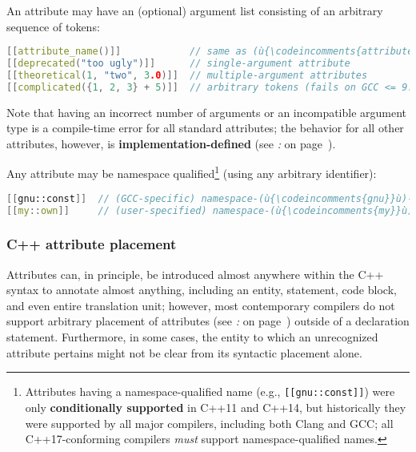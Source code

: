 \noindent An attribute may have an (optional) argument list consisting of an
arbitrary sequence of tokens:

\begin{lstlisting}[language=C++]
[[attribute_name()]]            // same as (ù{\codeincomments{attribute\_name}}ù)
[[deprecated("too ugly")]]      // single-argument attribute
[[theoretical(1, "two", 3.0)]]  // multiple-argument attributes
[[complicated({1, 2, 3} + 5)]]  // arbitrary tokens (fails on GCC <= 9.2)
\end{lstlisting}
    
\noindent Note that having an incorrect number of arguments or an incompatible
argument type is a compile-time error for all standard attributes; the
behavior for all other attributes, however, is
\textbf{implementation-defined} (see {\it{}:} {\it{}} on page~\pageref{unrecognized-attributes-have-implementation-defined-behavior}).

Any attribute may be namespace qualified{\cprotect\footnote{Attributes
having a namespace-qualified name (e.g., \texttt{[[gnu::const]]}) were
only \textbf{conditionally supported} in C++11 and C++14, but
historically they were supported by all major compilers, including both
Clang and GCC; all C++17-conforming compilers \textit{must} support namespace-qualified names.}} (using any arbitrary identifier):

\begin{lstlisting}[language=C++]
[[gnu::const]]  // (GCC-specific) namespace-(ù{\codeincomments{gnu}}ù)-qualified (ù{\codeincomments{const}}ù) attribute
[[my::own]]     // (user-specified) namespace-(ù{\codeincomments{my}}ù)-qualified (ù{\codeincomments{own}}ù) attribute
\end{lstlisting}
    

\subsubsection[C++ attribute placement]{C++ attribute placement}\label{c++-attribute-placement}

Attributes can, in principle, be introduced almost anywhere within the
C++ syntax to annotate almost anything, including an entity,
statement, code block, and even entire translation
unit; however, most contemporary compilers do not support arbitrary
placement of attributes (see {\it{}:} {\it{}} on page~\pageref{probing-where-attributes-are-permitted-in-the-compiler’s-c++-grammar}) outside of a
declaration statement. Furthermore, in some cases, the entity to
which an unrecognized attribute pertains might not be clear from its
syntactic placement alone.

